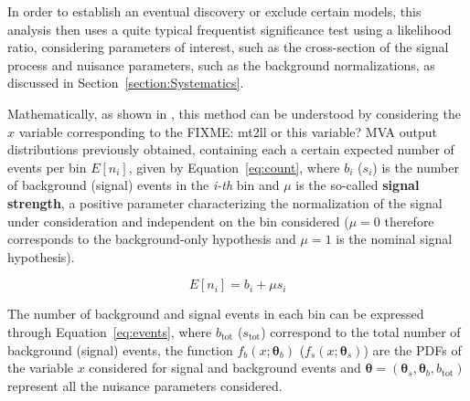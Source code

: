 \documentclass[a4paper, 10pt, openright]{report}
\begin{document}
%
%
%

In order to establish an eventual discovery or exclude certain models, this analysis then uses a quite typical frequentist significance test using a likelihood ratio, considering parameters of interest, such as the cross-section of the signal process and nuisance parameters, such as the background normalizations, as discussed in Section~\ref{section:Systematics}. 

Mathematically, as shown in \cite{asymptotic}, this method can be understood by considering the $x$ variable corresponding to the \color{red} FIXME: mt2ll or this variable? \ac{MVA} output distributions \color{black} previously obtained, containing each a certain expected number of events per bin $E[n_i]$, given by Equation~\ref{eq:count}, where $b_i$ ($s_i$) is the number of background (signal) events in the \textit{i-th} bin and $\mu$ is the so-called \textbf{signal strength}, a positive parameter characterizing the normalization of the signal under consideration and independent on the bin considered ($\mu = 0$ therefore corresponds to the background-only hypothesis and $\mu = 1$ is the nominal signal hypothesis).

\begin{equation}
\label{eq:count}
E[n_i] = b_i + \mu s_i
\end{equation}

The number of background and signal events in each bin can be expressed through Equation~\ref{eq:events}, where $b_{\text{tot}}$ ($s_{\text{tot}}$) correspond to the total number of background (signal) events, the function $f_b(x;\bm \theta_b)$ ($f_s(x;\bm \theta_s)$) are the \acp{PDF} of the variable $x$ considered for signal and background events and $\bm \theta = (\bm \theta_s, \bm \theta_b, b_\text{tot})$ represent all the nuisance parameters considered.
\end{document}
